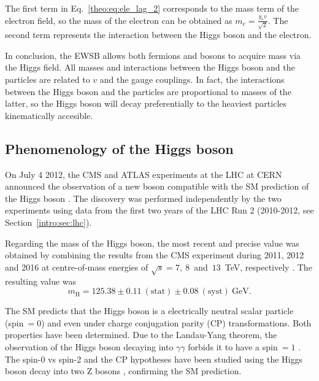 \documentclass[../main.tex]{subfiles}
\begin{document}
The first term in Eq.~\eqref{theo:eq:ele_lag_2} corresponds to the mass term of the electron field, so the mass of the electron can be obtained as $m_e = \frac{y_e v}{\sqrt{2}}$. The second term represents the interaction between the Higgs boson and the electron.

In conclusion, the EWSB allows both fermions and bosons to acquire mass via the Higgs field. All masses and interactions between the Higgs boson and the particles are related to $v$ and the gauge couplings. In fact, the interactions between the Higgs boson and the particles are proportional to masses of the latter, so the Higgs boson will decay preferentially to the heaviest particles kinematically accesible.

\subsection{Phenomenology of the Higgs boson}

On July 4 2012, the CMS and ATLAS experiments at the LHC at CERN announced the observation of a new boson compatible with the SM prediction of the Higgs boson \cite{intro:theo:cms_higgs, intro:theo:atlas_higgs}. The discovery was performed independently by the two experiments using data from the first two years of the LHC Run 2 (2010-2012, see Section~\ref{intro:sec:lhc}).

Regarding the mass of the Higgs boson, the most recent and precise value was obtained by combining the results from the CMS experiment during 2011, 2012 and 2016 at centre-of-mass energies of $\sqrt{s}=7,~8$~and~$13$~TeV, respectively \cite{intro:theo:cms_higgs_mass}. The resulting value was
\begin{equation}
m_\text{H} = 125.38 \pm 0.11 ~(\text{stat}) \pm 0.08 ~(\text{syst}) ~\text{GeV}.
\end{equation}

The SM predicts that the Higgs boson is a electrically neutral scalar particle (spin$~=0$) and even under charge conjugation parity (CP) transformations. Both properties have been determined. Due to the Landau-Yang theorem, the observation of the Higgs boson decaying into $\gamma\gamma$ forbids it to have a spin$~=1$ \cite{intro:theory:landau, intro:theory:yang}. The spin-0 vs spin-2 and the CP hypotheses have been studied using the Higgs boson decay into two Z bosons \cite{intro:theory:cmshzz}, confirming the SM prediction.
\end{document}
